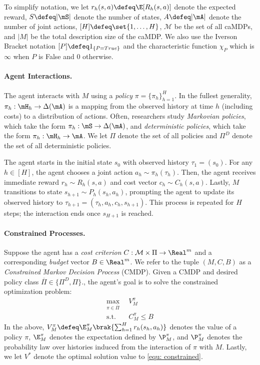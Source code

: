 \documentclass[pdftex, a4paper, 12pt]{article}
\newcommand{\gPi}{\overline{\Pi}}
\newcommand{\mM}{\mathcal{M}}
\begin{document}
To simplify notation, we let $r_h(s,a) \defeq \E[R_h(s,a)]$ denote the expected reward, $S \defeq |\mS|$ denote the number of states, $A \defeq |\mA|$ denote the number of joint actions, $[H] \defeq \set{1, \ldots, H}$, $\mathcal{M}$ be the set of all caMDPs, and $|M|$ be the total description size of the caMDP. We also use the Iverson Bracket notation $[P] \defeq 1_{\{P = True\}}$ and the characteristic function $\chi_{P}$ which is $\infty$ when $P$ is False and $0$ otherwise. 


\paragraph{Agent Interactions.} The agent interacts with $M$ using a \emph{policy} $\pi = \{\pi_h\}_{h = 1}^H$. In the fullest generality, $\pi_{h}: \mH_h \to \Delta(\mA)$ is a mapping from the observed history at time $h$ (including costs) to a distribution of actions. Often, researchers study \emph{Markovian policies}, which take the form $\pi_h : \mS \to \Delta(\mA)$, and \emph{deterministic policies}, which take the form $\pi_h: \mH_h \to \mA$. We let $\Pi$ denote the set of all policies and $\Pi^D$ denote the set of all deterministic policies.

The agent starts in the initial state $s_0$ with observed history $\tau_1 = (s_0)$. For any $h \in [H]$, the agent chooses a joint action $a_h \sim \pi_h(\tau_h)$. Then, the agent receives immediate reward $r_h \sim R_h(s,a)$ and cost vector $c_h \sim C_h(s,a)$. Lastly, $M$ transitions to state $s_{h+1} \sim P_h(s_h,a_h)$, prompting the agent to update its observed history to $\tau_{h+1} = (\tau_h, a_h, c_h, s_{h+1})$. This process is repeated for $H$ steps; the interaction ends once $s_{H+1}$ is reached.


\paragraph{Constrained Processes.} Suppose the agent has a \emph{cost criterion} $C : \mM \times \Pi \to \Real^m$ and a corresponding \emph{budget} vector $B \in \Real^m$. We refer to the tuple $(M, C, B)$ as a \emph{Constrained Markov Decision Process} (CMDP). Given a CMDP and desired policy class $\gPi \in \{\Pi^D, \Pi\}$., the agent's goal is to solve the constrained optimization problem: 
\begin{equation}\tag{CON}\label{equ: constrained}
\begin{split}
    \max_{\pi \in \gPi} \enspace & V_M^{\pi} \\
    \text{s.t.} \enspace & C_{M}^{\pi} \leq B 
\end{split}
\end{equation}
In the above, $V^{\pi}_M \defeq \E^{\pi}_M\brak{\sum_{h = 1}^H r_h(s_h,a_h)}$ denotes the value of a policy $\pi$, $\E^{\pi}_M$ denotes the expectation defined by $\P_M^{\pi}$, and $\P^{\pi}_M$ denotes the probability law over histories induced from the interaction of $\pi$ with $M$. Lastly, we let $V^*$ denote the optimal solution value to \eqref{equ: constrained}.
\end{document}
